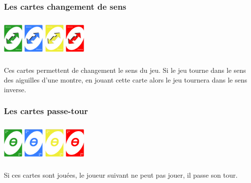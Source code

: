 \documentclass[french]{article}
\begin{document}
\subsubsection{Les cartes changement de sens}
\begin{center}
\centering
\includegraphics[width=1cm, height=2cm]{99v}
\includegraphics[width=1cm, height=2cm]{99b}
\includegraphics[width=1cm, height=2cm]{99j}
\includegraphics[width=1cm, height=2cm]{99r}
\end{center}
Ces cartes permettent de changement le sens du jeu. Si le jeu tourne dans le sens des aiguilles d'une montre, en jouant cette carte alors le jeu tournera dans le sens inverse.

\subsubsection{Les cartes passe-tour}
\begin{center}
	\centering
	\includegraphics[width=1cm, height=2cm]{55v}
	\includegraphics[width=1cm, height=2cm]{55b}
	\includegraphics[width=1cm, height=2cm]{55j}
	\includegraphics[width=1cm, height=2cm]{55r}
\end{center}
Si ces cartes sont jouées, le joueur suivant ne peut pas jouer, il passe son tour.
\end{document}
